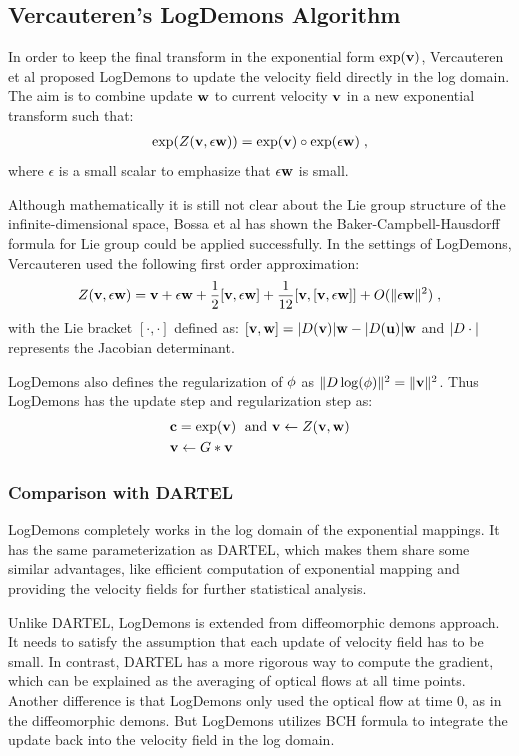 \documentclass[letterpaper,12pt]{article}
\begin{document}
\subsection{Vercauteren's LogDemons Algorithm}

In order to keep the final transform in the exponential form $\exp(\mathbf{v})$, Vercauteren et al proposed LogDemons \cite{Vercauteren2008Symmetric} to update the velocity field directly in the log domain. The aim is to combine update $\mathbf{w}$ to current velocity $\mathbf{v}$ in a new exponential transform such that:
\begin{align}
\exp(Z(\mathbf{v}, \epsilon \mathbf{w})) = \exp(\mathbf{v}) \circ \exp(\epsilon \mathbf{w}) \;,
\end{align}
where $\epsilon$ is a small scalar to emphasize that $\epsilon \mathbf{w}$ is small. 

Although mathematically it is still not clear about the Lie group structure of the infinite-dimensional space, Bossa et al has shown the Baker-Campbell-Hausdorff formula for Lie group could be applied successfully. In the settings of LogDemons, Vercauteren used the following first order approximation:
\begin{align}
Z(\mathbf{v}, \epsilon \mathbf{w}) = \mathbf{v} + \epsilon \mathbf{w} + \frac{1}{2}[\mathbf{v}, \epsilon\mathbf{w}]+\frac{1}{12}[\mathbf{v},[\mathbf{v},\epsilon\mathbf{w}]] + O(\|\epsilon\mathbf{w}\|^2) \;, 
\end{align}
with the Lie bracket $[\cdot,\cdot]$ defined as: 
$
[\mathbf{v},\mathbf{w}]=|D(\mathbf{v})|\mathbf{w}-|D(\mathbf{u})|\mathbf{w}
$
and $|D\cdot|$ represents the Jacobian determinant.

LogDemons also defines the regularization of $\phi$ as $\| D \log(\phi) \|^2=\|\mathbf{v}\|^2$. Thus LogDemons has the update step and regularization step as:
\begin{align}
 & \mathbf{c} = \exp(\mathbf{v}) \;\text{ and } \mathbf{v} \leftarrow Z(\mathbf{v}, \mathbf{w}) \\
 & \mathbf{v} \leftarrow {G} \ast \mathbf{v}
\end{align}

\subsubsection{Comparison with DARTEL}

LogDemons completely works in the log domain of the exponential mappings. It has the same parameterization as DARTEL, which makes them share some similar advantages, like efficient computation of exponential mapping and providing the velocity fields for further statistical analysis.

Unlike DARTEL, LogDemons is extended from diffeomorphic demons approach. It needs to satisfy the assumption that each update of velocity field has to be small. In contrast, DARTEL has a more rigorous way to compute the gradient, which can be explained as the averaging of optical flows at all time points. Another difference is that LogDemons only used the optical flow at time $0$, as in the diffeomorphic demons. But LogDemons utilizes BCH formula to integrate the update back into the velocity field in the log domain. 
\end{document}
